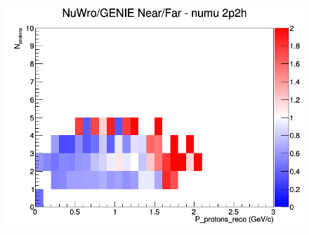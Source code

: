 \begin{figure}[h]
\endminipage
{}
\includegraphics[width=\linewidth]{eff_N_P/FGT/protons/ratios/2p2h_NuWro_GENIE_numu_NF_N_P.png}
\endminipage
\newline
\end{figure}
\clearpage

